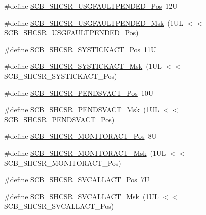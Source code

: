 \begin{DoxyCompactItemize}
\item 
\#define \hyperlink{group___c_m_s_i_s___s_c_b_ga3cf03acf1fdc2edc3b047ddd47ebbf87}{S\+C\+B\+\_\+\+S\+H\+C\+S\+R\+\_\+\+U\+S\+G\+F\+A\+U\+L\+T\+P\+E\+N\+D\+E\+D\+\_\+\+Pos}~12U
\item 
\#define \hyperlink{group___c_m_s_i_s___s_c_b_ga122b4f732732010895e438803a29d3cc}{S\+C\+B\+\_\+\+S\+H\+C\+S\+R\+\_\+\+U\+S\+G\+F\+A\+U\+L\+T\+P\+E\+N\+D\+E\+D\+\_\+\+Msk}~(1\+U\+L $<$$<$ S\+C\+B\+\_\+\+S\+H\+C\+S\+R\+\_\+\+U\+S\+G\+F\+A\+U\+L\+T\+P\+E\+N\+D\+E\+D\+\_\+\+Pos)
\item 
\#define \hyperlink{group___c_m_s_i_s___s_c_b_gaec9ca3b1213c49e2442373445e1697de}{S\+C\+B\+\_\+\+S\+H\+C\+S\+R\+\_\+\+S\+Y\+S\+T\+I\+C\+K\+A\+C\+T\+\_\+\+Pos}~11U
\item 
\#define \hyperlink{group___c_m_s_i_s___s_c_b_gafef530088dc6d6bfc9f1893d52853684}{S\+C\+B\+\_\+\+S\+H\+C\+S\+R\+\_\+\+S\+Y\+S\+T\+I\+C\+K\+A\+C\+T\+\_\+\+Msk}~(1\+U\+L $<$$<$ S\+C\+B\+\_\+\+S\+H\+C\+S\+R\+\_\+\+S\+Y\+S\+T\+I\+C\+K\+A\+C\+T\+\_\+\+Pos)
\item 
\#define \hyperlink{group___c_m_s_i_s___s_c_b_ga9b9fa69ce4c5ce7fe0861dbccfb15939}{S\+C\+B\+\_\+\+S\+H\+C\+S\+R\+\_\+\+P\+E\+N\+D\+S\+V\+A\+C\+T\+\_\+\+Pos}~10U
\item 
\#define \hyperlink{group___c_m_s_i_s___s_c_b_gae0e837241a515d4cbadaaae1faa8e039}{S\+C\+B\+\_\+\+S\+H\+C\+S\+R\+\_\+\+P\+E\+N\+D\+S\+V\+A\+C\+T\+\_\+\+Msk}~(1\+U\+L $<$$<$ S\+C\+B\+\_\+\+S\+H\+C\+S\+R\+\_\+\+P\+E\+N\+D\+S\+V\+A\+C\+T\+\_\+\+Pos)
\item 
\#define \hyperlink{group___c_m_s_i_s___s_c_b_ga8b71cf4c61803752a41c96deb00d26af}{S\+C\+B\+\_\+\+S\+H\+C\+S\+R\+\_\+\+M\+O\+N\+I\+T\+O\+R\+A\+C\+T\+\_\+\+Pos}~8U
\item 
\#define \hyperlink{group___c_m_s_i_s___s_c_b_gaad09b4bc36e9bccccc2e110d20b16e1a}{S\+C\+B\+\_\+\+S\+H\+C\+S\+R\+\_\+\+M\+O\+N\+I\+T\+O\+R\+A\+C\+T\+\_\+\+Msk}~(1\+U\+L $<$$<$ S\+C\+B\+\_\+\+S\+H\+C\+S\+R\+\_\+\+M\+O\+N\+I\+T\+O\+R\+A\+C\+T\+\_\+\+Pos)
\item 
\#define \hyperlink{group___c_m_s_i_s___s_c_b_ga977f5176be2bc8b123873861b38bc02f}{S\+C\+B\+\_\+\+S\+H\+C\+S\+R\+\_\+\+S\+V\+C\+A\+L\+L\+A\+C\+T\+\_\+\+Pos}~7U
\item 
\#define \hyperlink{group___c_m_s_i_s___s_c_b_ga634c0f69a233475289023ae5cb158fdf}{S\+C\+B\+\_\+\+S\+H\+C\+S\+R\+\_\+\+S\+V\+C\+A\+L\+L\+A\+C\+T\+\_\+\+Msk}~(1\+U\+L $<$$<$ S\+C\+B\+\_\+\+S\+H\+C\+S\+R\+\_\+\+S\+V\+C\+A\+L\+L\+A\+C\+T\+\_\+\+Pos)
\item 
$$
\end{DoxyCompactItemize}
